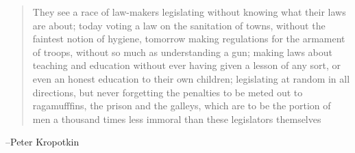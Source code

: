 \documentclass{exam}
\begin{document}
  \else
    \vspace{9 cm}
    \begin{quote}
      \begin{em}
        They see a race of law-makers legislating without knowing what their laws are
        about; today voting a law on the sanitation of towns, without the faintest
        notion of hygiene, tomorrow making regulations for the armament of troops,
        without so much as understanding a gun; making laws about teaching and
        education without ever having given a lesson of any sort, or even an honest
        education to their own children; legislating at random in all directions, but
        never forgetting the penalties to be meted out to ragamufffins, the prison
        and the galleys, which are to be the portion of men a thousand times less
        immoral than these legislators themselves
      \end{em}
    \end{quote}
    \hspace{1 cm} --Peter Kropotkin
  \fi
\end{document}

